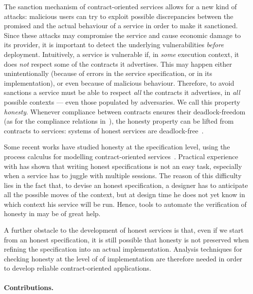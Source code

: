 The sanction mechanism of contract-oriented services
allows for a new kind of attacks: 
malicious users can try to exploit possible discrepancies between
the promised and the actual behaviour of a service
in order to make it sanctioned. %
Since these attacks may compromise the service and cause economic damage to its provider,
it is important to detect the underlying vulnerabilities 
\emph{before} deployment. %
Intuitively, a service is vulnerable if, 
in \emph{some} execution context,
it does \emph{not} respect some of the contracts it advertises.
This may happen either unintentionally
(because of errors in the service specification, or in its implementation),
or even because of malicious behaviour.
Therefore, to avoid sanctions a service must be able
to respect \emph{all} the contracts it advertises, in \emph{all} possible contexts
--- even those populated by adversaries.
We call this property \emph{honesty}.
Whenever compliance between contracts ensures their deadlock-freedom 
(as for the compliance relations in~\cite{Acciai10coordination,Barbanera10ppdp,Laneve07concur,Rensink07infoco}),
the honesty property can be lifted from contracts to services:
systems of honest services are deadlock-free~\cite{BZ15wsfm}.

Some recent works have studied honesty at the specification level, 
using the process calculus \coco for modelling contract-oriented services~\cite{BMSZ15jlamp,BTZ12sacs,BZ15wsfm}.
Practical experience with \coco has shown that writing honest specifications
is not an easy task, especially when a service has to juggle with multiple sessions.
The reason of this difficulty lies in the fact that,
to devise an honest specification, 
a designer has to anticipate all the possible moves of the context,
but at design time he does not yet know in which context his service will be run.
%
Hence, tools to automate the verification of honesty in \coco 
may be of great help.

A further obstacle to the development of honest services is that, 
even if we start from an honest \coco specification, 
it is still possible that honesty is not preserved
when refining the specification into an actual implementation.
%
Analysis techniques for checking honesty at the level of of implementation
are therefore needed in order to develop reliable contract-oriented applications.

\paragraph{Contributions.}


